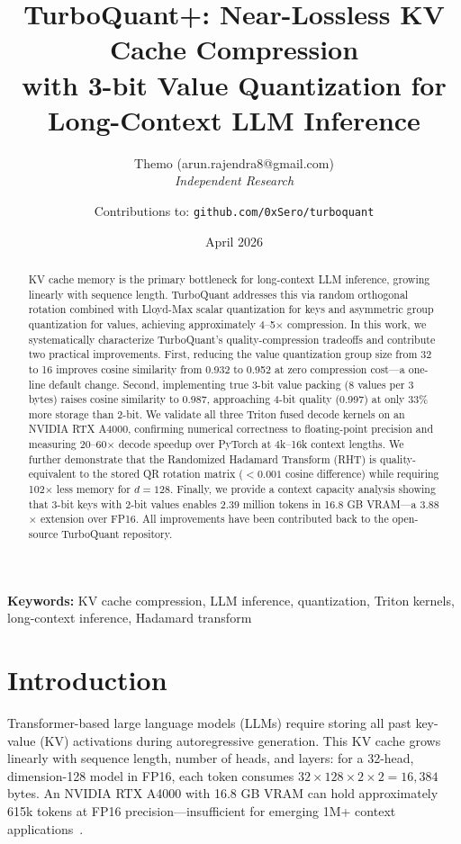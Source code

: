 \documentclass[10pt,twocolumn]{article}
\title{\textbf{TurboQuant+: Near-Lossless KV Cache Compression\\
with 3-bit Value Quantization for Long-Context LLM Inference}}
\author{
  Themo (arun.rajendra8@gmail.com)\\
  \textit{Independent Research}\\
  \and
  Contributions to: \texttt{github.com/0xSero/turboquant}
}
\date{April 2026}
\begin{document}
\maketitle

\begin{abstract}
KV cache memory is the primary bottleneck for long-context LLM inference, growing linearly with sequence length. TurboQuant addresses this via random orthogonal rotation combined with Lloyd-Max scalar quantization for keys and asymmetric group quantization for values, achieving approximately 4--5$\times$ compression. In this work, we systematically characterize TurboQuant's quality-compression tradeoffs and contribute two practical improvements. First, reducing the value quantization group size from 32 to 16 improves cosine similarity from 0.932 to 0.952 at zero compression cost—a one-line default change. Second, implementing true 3-bit value packing (8 values per 3 bytes) raises cosine similarity to 0.987, approaching 4-bit quality (0.997) at only 33\% more storage than 2-bit. We validate all three Triton fused decode kernels on an NVIDIA RTX A4000, confirming numerical correctness to floating-point precision and measuring 20--60$\times$ decode speedup over PyTorch at 4k--16k context lengths. We further demonstrate that the Randomized Hadamard Transform (RHT) is quality-equivalent to the stored QR rotation matrix ($< 0.001$ cosine difference) while requiring 102$\times$ less memory for $d = 128$. Finally, we provide a context capacity analysis showing that 3-bit keys with 2-bit values enables 2.39 million tokens in 16.8 GB VRAM—a 3.88$\times$ extension over FP16. All improvements have been contributed back to the open-source TurboQuant repository.
\end{abstract}

\textbf{Keywords:} KV cache compression, LLM inference, quantization, Triton kernels, long-context inference, Hadamard transform

\section{Introduction}
\label{sec:intro}

Transformer-based large language models (LLMs) require storing all past key-value (KV) activations during autoregressive generation. This KV cache grows linearly with sequence length, number of heads, and layers: for a 32-head, dimension-128 model in FP16, each token consumes $32 \times 128 \times 2 \times 2 = 16{,}384$ bytes. An NVIDIA RTX A4000 with 16.8 GB VRAM can hold approximately 615k tokens at FP16 precision—insufficient for emerging 1M+ context applications~\cite{liu2023longrange}.
\end{document}
